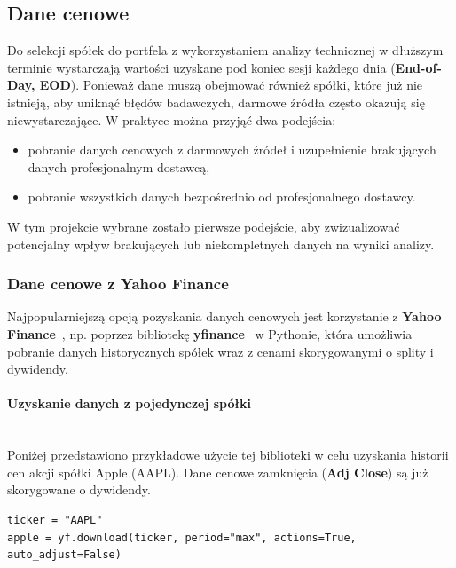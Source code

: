\documentclass[12pt, a4paper]{article}
\begin{document}
\subsection{Dane cenowe}

Do selekcji spółek do portfela z wykorzystaniem analizy technicznej w dłuższym terminie wystarczają wartości uzyskane pod koniec sesji każdego dnia (\textbf{End-of-Day, EOD}). Ponieważ dane muszą obejmować również spółki, które już nie istnieją, aby uniknąć błędów badawczych, darmowe źródła często okazują się niewystarczające. W praktyce można przyjąć dwa podejścia:

\begin{itemize}
    \item pobranie danych cenowych z darmowych źródeł i uzupełnienie brakujących danych profesjonalnym dostawcą,
    \item pobranie wszystkich danych bezpośrednio od profesjonalnego dostawcy.
\end{itemize}

W tym projekcie wybrane zostało pierwsze podejście, aby zwizualizować potencjalny wpływ brakujących lub niekompletnych danych na wyniki analizy.

\subsubsection{Dane cenowe z Yahoo Finance}

Najpopularniejszą opcją pozyskania danych cenowych jest korzystanie z \textbf{Yahoo Finance}~\cite{yahoo:finance}, np. poprzez bibliotekę \textbf{yfinance}~\cite{github:yfinance} w Pythonie, która umożliwia pobranie danych historycznych spółek wraz z cenami skorygowanymi o splity i dywidendy.

\paragraph{Uzyskanie danych z pojedynczej spółki} \leavevmode \\

Poniżej przedstawiono przykładowe użycie tej biblioteki w celu uzyskania historii cen akcji spółki Apple (AAPL). Dane cenowe zamknięcia (\textbf{Adj Close}) są już skorygowane o dywidendy.

\begin{lstlisting}[style=pythonstyle, caption={Pobieranie danych historycznych dla AAPL}]
ticker = "AAPL"
apple = yf.download(ticker, period="max", actions=True, auto_adjust=False)
\end{lstlisting}
\end{document}
